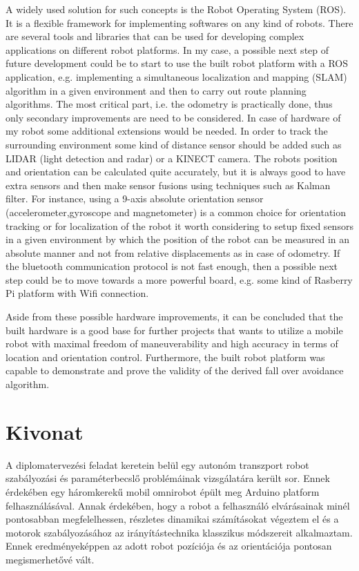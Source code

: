 \documentclass[12pt,english,twoside]{article}
\begin{document}
A widely used solution for such concepts is the Robot Operating System (ROS). It is a flexible framework for implementing softwares on any kind of robots. There are several tools and libraries that can be used for developing complex applications on different robot platforms. In my case, a possible next step of future development could be to start to use the built robot platform with a ROS application, e.g. implementing a simultaneous localization and mapping (SLAM) algorithm in a given environment and then to carry out route planning algorithms. The most critical part, i.e. the odometry is practically done, thus only secondary improvements are need to be considered. In case of hardware of my robot some additional extensions would be needed. In order to track the surrounding environment some kind of distance sensor should be added such as LIDAR (light detection and radar) or a KINECT camera. The robots position and orientation can be calculated quite accurately, but it is always good to have extra sensors and then make sensor fusions using techniques such as Kalman filter. For instance, using a 9-axis absolute orientation sensor (accelerometer,gyroscope and magnetometer) is a common choice for orientation tracking or for localization of the robot it worth considering to setup fixed sensors in a given environment by which the position of the robot can be measured in an absolute manner and not from relative displacements as in case of odometry. If the bluetooth communication protocol is not fast enough, then a possible next step could be to move towards a more powerful board, e.g. some kind of Rasberry Pi platform with Wifi connection. 

Aside from these possible hardware improvements, it can be concluded that the built hardware is a good base for further projects that wants to utilize a mobile robot with maximal freedom of maneuverability and high accuracy in terms of location and orientation control. Furthermore, the built robot platform was capable to demonstrate and prove the validity of the derived fall over avoidance algorithm.

\newpage
\section*{Kivonat}
A diplomatervezési feladat keretein belül egy autonóm transzport robot szabályozási és paraméterbecslő problémáinak vizsgálatára került sor. Ennek érdekében egy háromkerekű mobil omnirobot épült meg Arduino platform felhasználásával. Annak érdekében, hogy a robot a felhasználó elvárásainak minél pontosabban megfelelhessen, részletes dinamikai számításokat végeztem el és a motorok szabályozásához az irányítástechnika klasszikus módszereit alkalmaztam. Ennek eredményeképpen az adott robot pozíciója és az orientációja pontosan megismerhetővé vált.
\end{document}
